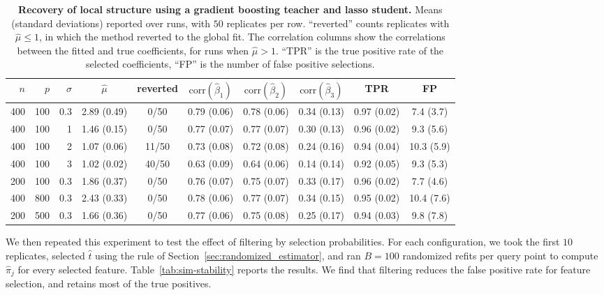 \documentclass[12pt]{article}
\theoremstyle{definition}
\begin{document}
\begin{table}[t]
\centering
\footnotesize
\begin{tabular}{rrr | cc | ccc | cc}
\toprule
$n$ & $p$ & $\sigma$ & $\hat\mu$ & reverted
  & $\mathrm{corr}(\hat\beta_1)$ & $\mathrm{corr}(\hat\beta_2)$
  & $\mathrm{corr}(\hat\beta_3)$ & TPR & FP \\
\midrule
400 & 100 & 0.3 & 2.89 (0.49) & 0/50 & 0.79 (0.06) & 0.78 (0.06) & 0.34 (0.13) & 0.97 (0.02) & 7.4 (3.7) \\
400 & 100 & 1 & 1.46 (0.15) & 0/50 & 0.77 (0.07) & 0.77 (0.07) & 0.30 (0.13) & 0.96 (0.02) & 9.3 (5.6) \\
400 & 100 & 2 & 1.07 (0.06) & 11/50 & 0.73 (0.08) & 0.72 (0.08) & 0.24 (0.16) & 0.94 (0.04) & 10.3 (5.9) \\
400 & 100 & 3 & 1.02 (0.02) & 40/50 & 0.63 (0.09) & 0.64 (0.06) & 0.14 (0.14) & 0.92 (0.05) & 9.3 (5.3) \\
200 & 100 & 0.3 & 1.86 (0.37) & 0/50 & 0.76 (0.07) & 0.75 (0.07) & 0.33 (0.17) & 0.96 (0.02) & 7.7 (4.6) \\
400 & 800 & 0.3 & 2.43 (0.33) & 0/50 & 0.78 (0.06) & 0.77 (0.07) & 0.34 (0.15) & 0.95 (0.02) & 10.4 (7.6) \\
200 & 500 & 0.3 & 1.66 (0.36) & 0/50 & 0.77 (0.06) & 0.75 (0.08) & 0.25 (0.17) & 0.94 (0.03) & 9.8 (7.8) \\
\bottomrule
\end{tabular}
\caption{\textbf{Recovery of local structure using a gradient boosting teacher and lasso student.} Means (standard
deviations) reported over runs, with $50$ replicates per row. ``reverted'' counts replicates with $\hat\mu \le 1$, in which the method reverted to the global fit. The correlation columns show the correlations between the fitted and true coefficients, for runs when $\hat\mu > 1$. ``TPR'' is the true positive rate of the selected coefficients, ``FP'' is the number of false positive selections.}
\label{tab:sim-recovery}
\end{table}

We then repeated this experiment to test the effect of filtering by selection probabilities. For each configuration, we took the first $10$ replicates, selected $\hat t$ using the rule of Section~\ref{sec:randomized_estimator}, and ran $B = 100$ randomized refits per query point to compute $\hat\pi_j$ for every selected feature. Table~\ref{tab:sim-stability} reports the results. We find that filtering reduces the false positive rate for feature selection, and retains most of the true positives.
\end{document}
